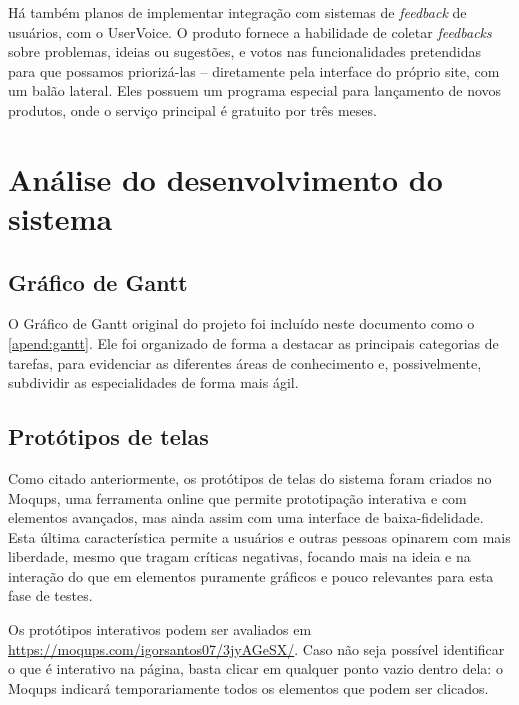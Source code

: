 \documentclass[12pt,a4paper,twoside,hyphens,english,brazil]{abntex2}
\begin{document}
{Há também planos de implementar integração com sistemas de \emph{feedback} de usuários, com o UserVoice. O produto fornece a habilidade de coletar \emph{feedbacks} sobre problemas, ideias ou sugestões, e votos nas funcionalidades pretendidas para que possamos priorizá-las -- diretamente pela interface do próprio site, com um balão lateral\cite{uservoice-product}. Eles possuem um programa especial para lançamento de novos produtos, onde o serviço principal é gratuito por três meses\cite{uservoice-launch}.


\section{Análise do desenvolvimento do sistema}

\subsection{Gráfico de Gantt}
O Gráfico de Gantt original do projeto foi incluído neste documento como o \autoref{apend:gantt}. Ele foi organizado de forma a destacar as principais categorias de tarefas, para evidenciar as diferentes áreas de conhecimento e, possivelmente, subdividir as especialidades de forma mais ágil.


\subsection{Protótipos de telas}
Como citado anteriormente, os protótipos de telas do sistema foram criados no Moqups, uma ferramenta online que permite prototipação interativa e com elementos avançados, mas ainda assim com uma interface de baixa-fidelidade. Esta última característica permite a usuários e outras pessoas opinarem com mais liberdade, mesmo que tragam críticas negativas, focando mais na ideia e na interação do que em elementos puramente gráficos e pouco relevantes para esta fase de testes.\cite{low-fidelity-se}\cite{low-fidelity}

Os protótipos interativos podem ser avaliados em \url{https://moqups.com/igorsantos07/3jyAGeSX/}. Caso não seja possível identificar o que é interativo na página, basta clicar em qualquer ponto vazio dentro dela: o Moqups indicará temporariamente todos os elementos que podem ser clicados.

}
\end{document}
